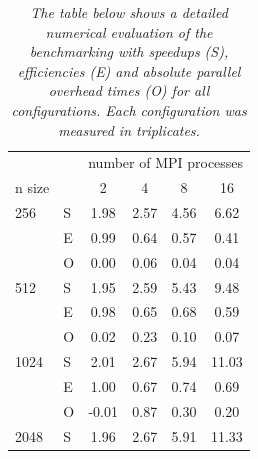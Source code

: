 \documentclass[a4paper,11pt,twoside,table,xcdraw]{article}
\begin{document}
\begin{table}[]
\centering
\caption{\textit{The table below shows a detailed numerical evaluation of the benchmarking with speedups (S), efficiencies (E) and absolute parallel overhead times (O) for all configurations. Each configuration was measured in triplicates.}}
\label{tab:result}
\begin{tabular}{
>{\columncolor[HTML]{C0C0C0}}l 
>{\columncolor[HTML]{EFEFEF}}l |cccc}
\cellcolor[HTML]{EFEFEF}       &   & \multicolumn{4}{c|}{\cellcolor[HTML]{C0C0C0}number of MPI processes}                                           \\
\cellcolor[HTML]{EFEFEF}n size &   & \cellcolor[HTML]{EFEFEF}2 & \cellcolor[HTML]{EFEFEF}4 & \cellcolor[HTML]{EFEFEF}8 & \cellcolor[HTML]{EFEFEF}16 \\ \hline
256                            & S & 1.98                      & 2.57                      & 4.56                      & 6.62                       \\
                               & E & 0.99                      & 0.64                      & 0.57                      & 0.41                       \\
                               & O & 0.00                      & 0.06                      & 0.04                      & 0.04                       \\ \hline
512                            & S & 1.95                      & 2.59                      & 5.43                      & 9.48                       \\
                               & E & 0.98                      & 0.65                      & 0.68                      & 0.59                       \\
                               & O & 0.02                      & 0.23                      & 0.10                      & 0.07                       \\ \hline
1024                           & S & 2.01                      & 2.67                      & 5.94                      & 11.03                      \\
                               & E & 1.00                      & 0.67                      & 0.74                      & 0.69                       \\
                               & O & -0.01                     & 0.87                      & 0.30                      & 0.20                       \\ \hline
2048                           & S & 1.96                      & 2.67                      & 5.91                      & 11.33                      \\

\end{tabular}
\end{table}
\end{document}

